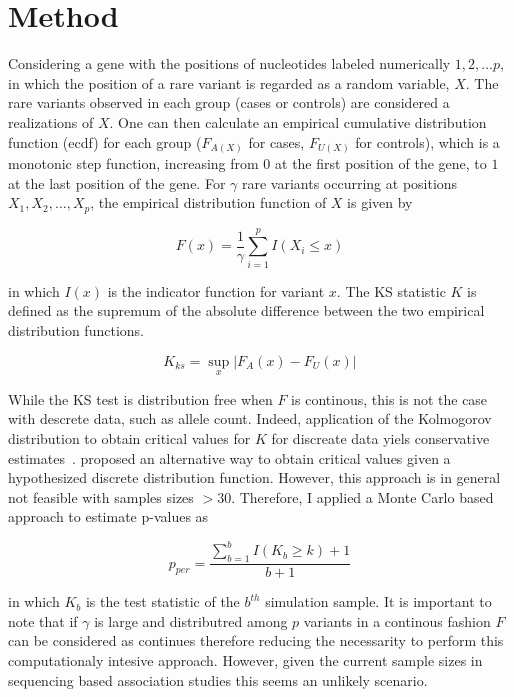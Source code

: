 \section{Method}
\label{sec:method}

Considering a gene with the positions of nucleotides labeled numerically $1, 2, \ldots p$, in which the position of a rare variant is regarded as a random variable, $X$.
The rare variants observed in each group (cases or controls) are considered a realizations of $X$.
One can then calculate an empirical cumulative distribution function (ecdf) for each group ($F_{A(X)}$ for cases, $F_{U(X)}$ for controls), which is a monotonic step function, increasing from $0$ at the first position of the gene, to $1$ at the last position of the gene.
For $\gamma$ rare variants occurring at positions $X_1, X_2, \ldots, X_p$, the empirical distribution function of $X$ is given by

\begin{equation}
  F(x) = \frac{1}{\gamma}\sum^p_{i=1}I(X_i \leq x)
\end{equation}

in which $I(x)$ is the indicator function for variant $x$.
The KS statistic $K$ is defined as the supremum of the absolute difference between the two empirical distribution functions.

\begin{equation}
	K_{ks} = \sup_x | F_A(x) - F_U(x) |
\end{equation}

While the KS test is distribution free when $F$ is continous, this is not the case with descrete data, such as allele count.
Indeed, application of the Kolmogorov distribution to obtain critical values for $K$ for discreate data yiels conservative estimates~\cite{Walsh1963,Conover1972}. 
\citet{Conover1972} proposed an alternative way to obtain critical values given a hypothesized discrete distribution function.
However, this approach is in general not feasible with samples sizes $>30$.
Therefore, I applied a Monte Carlo based approach to estimate p-values as 

\begin{equation}
  p_{per} = \frac{\sum^b_{b=1} I(K_b \geq k)+1}{b+1}
\end{equation}

in which $K_b$ is the test statistic of the $b^{th}$ simulation sample.
It is important to note that if $\gamma$ is large and distributred among $p$ variants in a continous fashion $F$ can be considered as continues therefore reducing the necessarity to perform this computationaly intesive approach.
However, given the current sample sizes in sequencing based association studies this seems an unlikely scenario.

